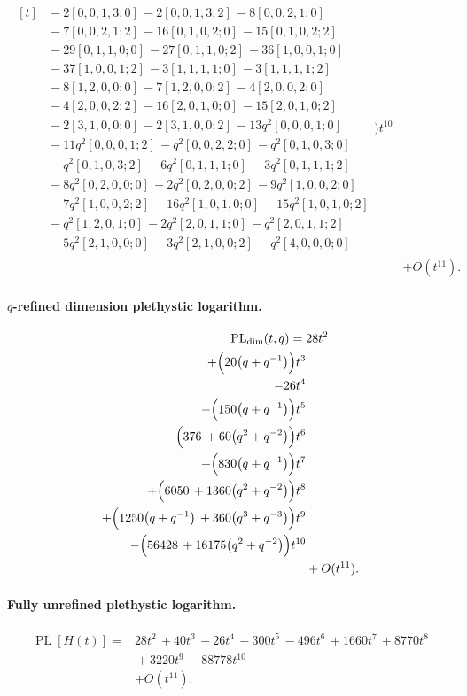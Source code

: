 \documentclass[10pt]{article}
\begin{document}
\[\begin{aligned}
\begin{aligned}[t]
  &{}-2[0,0,1,3;0]\,-2[0,0,1,3;2]\,-8[0,0,2,1;0] \\
  &{}-7[0,0,2,1;2]\,-16[0,1,0,2;0]\,-15[0,1,0,2;2] \\
  &{}-29[0,1,1,0;0]\,-27[0,1,1,0;2]\,-36[1,0,0,1;0] \\
  &{}-37[1,0,0,1;2]\,-3[1,1,1,1;0]\,-3[1,1,1,1;2] \\
  &{}-8[1,2,0,0;0]\,-7[1,2,0,0;2]\,-4[2,0,0,2;0] \\
  &{}-4[2,0,0,2;2]\,-16[2,0,1,0;0]\,-15[2,0,1,0;2] \\
  &{}-2[3,1,0,0;0]\,-2[3,1,0,0;2]\,-13q^{2}[0,0,0,1;0] \\
  &{}-11q^{2}[0,0,0,1;2]\,-q^{2}[0,0,2,2;0]\,-q^{2}[0,1,0,3;0] \\
  &{}-q^{2}[0,1,0,3;2]\,-6q^{2}[0,1,1,1;0]\,-3q^{2}[0,1,1,1;2] \\
  &{}-8q^{2}[0,2,0,0;0]\,-2q^{2}[0,2,0,0;2]\,-9q^{2}[1,0,0,2;0] \\
  &{}-7q^{2}[1,0,0,2;2]\,-16q^{2}[1,0,1,0;0]\,-15q^{2}[1,0,1,0;2] \\
  &{}-q^{2}[1,2,0,1;0]\,-2q^{2}[2,0,1,1;0]\,-q^{2}[2,0,1,1;2] \\
  &{}-5q^{2}[2,1,0,0;0]\,-3q^{2}[2,1,0,0;2]\,-q^{2}[4,0,0,0;0]\end{aligned}\Bigr)t^{10} \\
  &+ O(t^{11}).
\end{aligned}
\]
\paragraph{$q$-refined dimension plethystic logarithm.}
\[
\begin{aligned}
\operatorname{PL}_{\mathrm{dim}}(t,q) ={}&
   28t^{2} \\
  + \Bigl(20\bigl(q+q^{-1}\bigr)\Bigr)t^{3} \\
  -26t^{4} \\
  -\Bigl(150\bigl(q+q^{-1}\bigr)\Bigr)t^{5} \\
  -\Bigl(376\,+60\bigl(q^{2}+q^{-2}\bigr)\Bigr)t^{6} \\
  + \Bigl(830\bigl(q+q^{-1}\bigr)\Bigr)t^{7} \\
  + \Bigl(6050\,+1360\bigl(q^{2}+q^{-2}\bigr)\Bigr)t^{8} \\
  + \Bigl(1250\bigl(q+q^{-1}\bigr)\,+360\bigl(q^{3}+q^{-3}\bigr)\Bigr)t^{9} \\
  -\Bigl(56428\,+16175\bigl(q^{2}+q^{-2}\bigr)\Bigr)t^{10} \\
  &+ O(t^{11}).
\end{aligned}
\]
\paragraph{Fully unrefined plethystic logarithm.}
\[
\begin{aligned}
\operatorname{PL}[H(t)] ={}& 28t^{2}\,+40t^{3}\,-26t^{4}\,-300t^{5}\,-496t^{6}\,+1660t^{7}\,+8770t^{8} \\
  &{}+3220t^{9}\,-88778t^{10} \\
  &+ O(t^{11}).
\end{aligned}
\]
\end{document}
